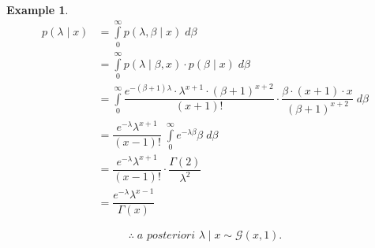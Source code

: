\documentclass[12pt, a4paper]{article}
\theoremstyle{definition}
\newtheorem{example}{Example}
\begin{document}
\begin{example}
\begin{align*}
p\left( \lambda \mid x \right) &= \displaystyle{\int \limits_{0}^{\infty} p\left( \lambda, \beta \mid x \right) \; d\beta} \\[0.5em]
&= \displaystyle{\int \limits_{0}^{\infty} p\left( \lambda \mid \beta, x \right) \cdot p\left( \beta \mid x \right) \; d\beta} \\[0.5em]
&= \displaystyle{\int \limits_{0}^{\infty} \dfrac{e^{-\left( \beta + 1 \right)\lambda} \cdot \lambda^{x + 1} \cdot \left(\beta + 1\right)^{x + 2}}{\left( x + 1 \right)!} \cdot \dfrac{\beta \cdot \left( x + 1 \right) \cdot x}{\left( \beta + 1 \right)^{x + 2}}} \; d\beta \\[0.5em]
&= \dfrac{e^{-\lambda} \lambda^{x+1}}{\left( x - 1 \right)!} \; \displaystyle{\int \limits_{0}^{\infty} e^{-\lambda \beta} \beta} \; d\beta \\[0.5em]
&= \dfrac{e^{-\lambda} \lambda^{x+1}}{\left( x - 1 \right)!} \cdot \dfrac{\Gamma\left( 2 \right)}{\lambda^2} \\[0.5em]
&= \dfrac{e^{-\lambda} \lambda^{x-1}}{\Gamma\left( x \right)}
\end{align*}

$$\boxed{\therefore \; \textit{a posteriori } \lambda \mid x \sim \mathcal{G}\left( x, 1\right).}$$
\end{example}
\end{document}
